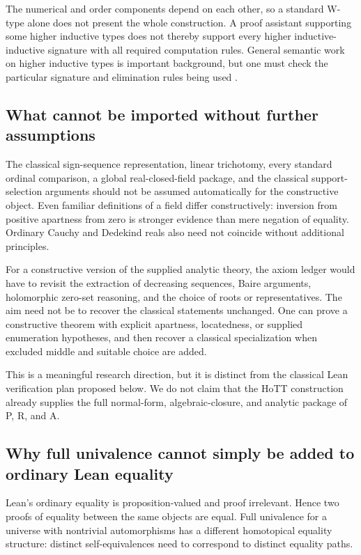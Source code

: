 \documentclass[11pt,letterpaper]{article}
\numberwithin{equation}{section}
\theoremstyle{definition}
\theoremstyle{remark}
\begin{document}
The numerical and order components depend on each other, so a standard W-type alone does not present the whole construction. A proof assistant supporting some higher inductive types does not thereby support every higher inductive-inductive signature with all required computation rules. General semantic work on higher inductive types is important background, but one must check the particular signature and elimination rules being used \cite{HITSemantics,CubicalHIT}.

\subsection{What cannot be imported without further assumptions}
The classical sign-sequence representation, linear trichotomy, every standard ordinal comparison, a global real-closed-field package, and the classical support-selection arguments should not be assumed automatically for the constructive object. Even familiar definitions of a field differ constructively: inversion from positive apartness from zero is stronger evidence than mere negation of equality. Ordinary Cauchy and Dedekind reals also need not coincide without additional principles.

For a constructive version of the supplied analytic theory, the axiom ledger would have to revisit the extraction of decreasing sequences, Baire arguments, holomorphic zero-set reasoning, and the choice of roots or representatives. The aim need not be to recover the classical statements unchanged. One can prove a constructive theorem with explicit apartness, locatedness, or supplied enumeration hypotheses, and then recover a classical specialization when excluded middle and suitable choice are added.

This is a meaningful research direction, but it is distinct from the classical Lean verification plan proposed below. We do not claim that the HoTT construction already supplies the full normal-form, algebraic-closure, and analytic package of P, R, and A.

\subsection{Why full univalence cannot simply be added to ordinary Lean equality}
Lean's ordinary equality is proposition-valued and proof irrelevant. Hence two proofs of equality between the same objects are equal. Full univalence for a universe with nontrivial automorphisms has a different homotopical equality structure: distinct self-equivalences need to correspond to distinct equality paths.
\end{document}
